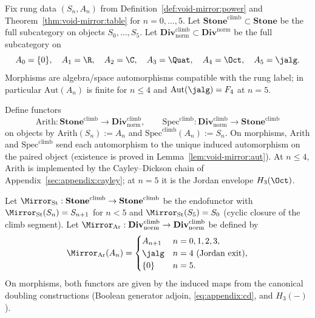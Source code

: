 \begin{definition}\label{def:void-mirror:climb-cat}
Fix rung data $(S_n,A_n)$ from Definition~\ref{def:void-mirror:power} and
Theorem~\ref{thm:void-mirror:table} for $n=0,\ldots,5$. Let
$\mathbf{Stone}^{\mathrm{climb}}\subset\mathbf{Stone}$ be the full subcategory
on objects $S_0,\ldots,S_5$. Let
$\mathbf{Div}^{\mathrm{climb}}_{\mathrm{norm}}\subset\mathbf{Div}^{\mathrm{norm}}$
be the full subcategory on
\[
  A_0=\{0\},\quad A_1=\R,\quad A_2=\C,\quad A_3=\Quat,\quad A_4=\Oct,\quad
  A_5=\jalg.
\]
Morphisms are algebra/space automorphisms compatible with the rung label; in
particular $\mathrm{Aut}(A_n)$ is finite for $n\leq4$ and
$\mathrm{Aut}(\jalg)=F_4$ at $n=5$.
\end{definition}

\begin{definition}\label{def:void-mirror:functors}
Define functors
\[
  \mathrm{Arith}:\mathbf{Stone}^{\mathrm{climb}}\longrightarrow
  \mathbf{Div}^{\mathrm{climb}}_{\mathrm{norm}},
  \qquad
  \mathrm{Spec}^{\mathrm{climb}}:
  \mathbf{Div}^{\mathrm{climb}}_{\mathrm{norm}}\longrightarrow
  \mathbf{Stone}^{\mathrm{climb}}
\]
on objects by $\mathrm{Arith}(S_n):=A_n$ and $\mathrm{Spec}^{\mathrm{climb}}(A_n):=S_n$.
On morphisms, $\mathrm{Arith}$ and $\mathrm{Spec}^{\mathrm{climb}}$ send each
automorphism to the unique induced automorphism on the paired object (existence
is proved in Lemma~\ref{lem:void-mirror:aut}). At $n\leq4$, $\mathrm{Arith}$
is implemented by the Cayley--Dickson chain of
Appendix~\ref{sec:appendix:cayley}; at $n=5$ it is the Jordan envelope
$H_3(\Oct)$.
\end{definition}

\begin{definition}\label{def:void-mirror:mirror-functor}
Let $\Mirror_{\mathrm{St}}:\mathbf{Stone}^{\mathrm{climb}}\to\mathbf{Stone}^{\mathrm{climb}}$
be the endofunctor with $\Mirror_{\mathrm{St}}(S_n)=S_{n+1}$ for $n<5$ and
$\Mirror_{\mathrm{St}}(S_5)=S_0$ (cyclic closure of the climb segment). Let
$\Mirror_{\mathrm{Ar}}:\mathbf{Div}^{\mathrm{climb}}_{\mathrm{norm}}\to
\mathbf{Div}^{\mathrm{climb}}_{\mathrm{norm}}$ be defined by
\[
  \Mirror_{\mathrm{Ar}}(A_n)=
  \begin{cases}
    A_{n+1} & n=0,1,2,3,\\
    \jalg & n=4\ (\text{Jordan exit}),\\
    \{0\} & n=5.
  \end{cases}
\]
On morphisms, both functors are given by the induced maps from the canonical
doubling constructions (Boolean generator adjoin, \eqref{eq:appendix:cd}, and
$H_3(-)$).
\end{definition}

